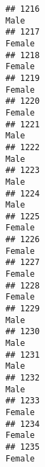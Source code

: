\documentclass[]{article}
\begin{document}
\begin{verbatim}
## 1216                                                                                                                            Male
## 1217                                                                                                                          Female
## 1218                                                                                                                          Female
## 1219                                                                                                                          Female
## 1220                                                                                                                          Female
## 1221                                                                                                                            Male
## 1222                                                                                                                            Male
## 1223                                                                                                                            Male
## 1224                                                                                                                            Male
## 1225                                                                                                                          Female
## 1226                                                                                                                          Female
## 1227                                                                                                                          Female
## 1228                                                                                                                          Female
## 1229                                                                                                                            Male
## 1230                                                                                                                            Male
## 1231                                                                                                                            Male
## 1232                                                                                                                            Male
## 1233                                                                                                                          Female
## 1234                                                                                                                          Female
## 1235                                                                                                                          Female

\end{verbatim}
\end{document}
